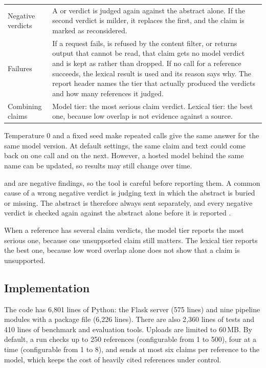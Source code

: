\documentclass{article}
\newcommand{\vd}[1]{\texttt{\detokenize{#1}}}
\begin{document}
\begin{table}[htbp]
\begin{tabularx}{\textwidth}{@{}>{\raggedright\arraybackslash}p{3.3cm} X@{}}
\addlinespace
Negative verdicts & A \vd{weak} or \vd{unrelated} verdict is judged again against the abstract alone. If the second verdict is milder, it replaces the first, and the claim is marked as reconsidered.\\
\addlinespace
Failures & If a request fails, is refused by the content filter, or returns output that cannot be read, that claim gets no model verdict and is kept as \vd{unverified} rather than dropped. If no call for a reference succeeds, the lexical result is used and its reason says why. The report header names the tier that actually produced the verdicts and how many references it judged.\\
\addlinespace
Combining claims & Model tier: the most serious claim verdict. Lexical tier: the best one, because low overlap is not evidence against a source.\\
\bottomrule
\end{tabularx}
\end{table}

Temperature 0 and a fixed seed make repeated calls give the same answer for the same model version. At default settings, the same claim and text could come back \vd{related} on one call and \vd{weak} on the next. However, a hosted model behind the same name can be updated, so results may still change over time.

\vd{unrelated} and \vd{weak} are negative findings, so the tool is careful before reporting them. A common cause of a wrong negative verdict is judging text in which the abstract is buried or missing. The abstract is therefore always sent separately, and every negative verdict is checked again against the abstract alone before it is reported \cite{ji2023}.

When a reference has several claim verdicts, the model tier reports the most serious one, because one unsupported claim still matters. The lexical tier reports the best one, because low word overlap alone does not show that a claim is unsupported.

\subsection{Implementation}

The code has 6{,}801 lines of Python: the Flask server (575 lines) and nine pipeline modules with a package file (6{,}226 lines). There are also 2{,}360 lines of tests and 410 lines of benchmark and evaluation tools. Uploads are limited to 60\,MB. By default, a run checks up to 250 references (configurable from 1 to 500), four at a time (configurable from 1 to 8), and sends at most six claims per reference to the model, which keeps the cost of heavily cited references under control.
\end{document}
